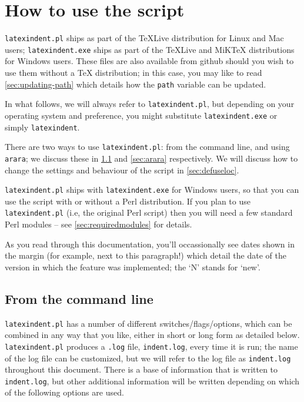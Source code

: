\section{How to use the script}
 \texttt{latexindent.pl} ships as part of the \TeX Live distribution for
 Linux and Mac users; \texttt{latexindent.exe} ships as part of the \TeX Live
 and MiK\TeX{} distributions for Windows users. These files are also available
 from github \cite{latexindent-home} should you wish to use them without
 a \TeX{} distribution; in this case, you may like to read \vref{sec:updating-path}
 which details how the \texttt{path} variable can be updated.

 In what follows, we will always refer to \texttt{latexindent.pl}, but depending on
 your operating system and preference, you might substitute \texttt{latexindent.exe} or
 simply \texttt{latexindent}.

 There are two ways to use \texttt{latexindent.pl}: from the command line,
 and using \texttt{arara}; we discuss these in \cref{sec:commandline} and
 \cref{sec:arara} respectively. We will discuss how to change the settings and
 behaviour of the script in \vref{sec:defuseloc}.

 \texttt{latexindent.pl} ships with \texttt{latexindent.exe} for Windows
 users, so that you can use the script with or without a Perl distribution.
 If you plan to use \texttt{latexindent.pl} (i.e, the original Perl script) then you will
 need a few standard Perl modules -- see \vref{sec:requiredmodules} for details.

 As you read through this documentation, you'll occassionally see dates shown in the margin
 (for example, next to this paragraph!)
	 which detail the date of the version in which the feature was implemented; 
    the `N' stands for `new'.

\subsection{From the command line}\label{sec:commandline}
	\texttt{latexindent.pl} has a number of different switches/flags/options, which
	can be combined in any way that you like, either in short or long form as detailed below.
	\texttt{latexindent.pl}  produces a \texttt{.log} file, \texttt{indent.log}, every time it
	is run; the name of the log file can be customized, but we will
	refer to the log file as \texttt{indent.log} throughout this document.
	There is a base of information that is written to \texttt{indent.log},
	but other additional information will be written depending
	on which of the following options are used.


